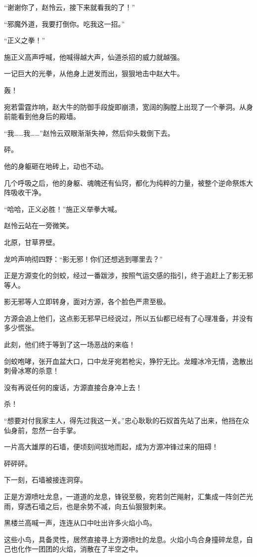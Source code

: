 \begin{this_body}
“谢谢你了，赵怜云，接下来就看我的了！”

“邪魔外道，我要打倒你。吃我这一招。”

“正义之拳！”

施正义高声呼喊，他喊得越大声，仙道杀招的威力就越强。

一记巨大的光拳，从他身上迸发而出，狠狠地击中赵大牛。

轰！

宛若雷霆炸响，赵大牛的防御手段旋即崩溃，宽阔的胸膛上出现了一个拳洞。从身前能看到他身后的殿墙。

“我……我……”赵怜云双眼渐渐失神，然后仰头栽倒下去。

砰。

他的身躯砸在地砖上，动也不动。

几个呼吸之后，他的身躯、魂魄还有仙窍，都化为纯粹的力量，被整个逆命祭炼大阵吸收干净。

“哈哈，正义必胜！”施正义举拳大喊。

赵怜云站在一旁微笑。

北原，甘草界壁。

龙吟声响彻四野：“影无邪！你们还想逃到哪里去？”

正是方源变化的剑蛟，经过一番跋涉，按照气运交感的指引，终于追赶上了影无邪等人。

影无邪等人立即转身，面对方源，各个脸色严肃至极。

方源会追上他们，这点影无邪早已经说过，所以五仙都已经有了心理准备，并没有多少慌张。

此刻，他们终于等到了这一场恶战的来临！

剑蛟咆哮，张开血盆大口，口中龙牙宛若枪尖，狰狞无比。龙瞳冰冷无情，逸散出刺骨冰寒的杀意！

没有再说任何的废话，方源直接合身冲上去！

杀！

“想要对付我家主人，得先过我这一关。”忠心耿耿的石奴首先站了出来，他挡在众仙身前，忽然一台手掌。

一片高大雄厚的石墙，便顷刻间拔地而起，成为方源冲锋过来的阻碍！

砰砰砰。

下一刻，石墙被接连洞穿。

正是方源喷吐龙息，一道道的龙息，锋锐至极，宛若剑芒飚射，汇集成一阵剑芒光雨，穿透石墙之后，也是余势不减，向五仙狠狠刺来。

黑楼兰高喊一声，连连从口中吐出许多火焰小鸟。

这些小鸟，具备灵性，居然直接寻上方源喷吐的龙息。火焰小鸟合身撞碎龙息，自己也化作一团团的火焰，消散在了半空之中。


\end{this_body}
